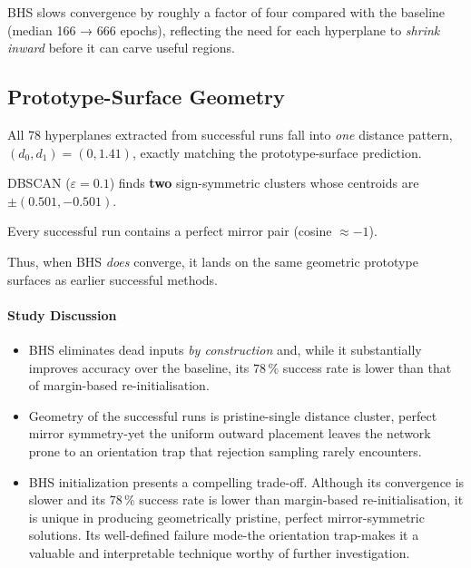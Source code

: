 BHS slows convergence by roughly a factor of four compared with the
baseline (median 166 → 666 epochs), reflecting the need for each
hyperplane to \emph{shrink inward} before it can carve useful regions.

\subsection*{Prototype-Surface Geometry}

\begin{description}[leftmargin=2em]
  \item[Distance clusters]
        All 78 hyperplanes extracted from successful runs fall into
        \emph{one} distance pattern,
        \((d_{0},d_{1})\!=\!(0,1.41)\),
        exactly matching the prototype-surface prediction.
  \item[Weight clusters]
        DBSCAN ($\varepsilon=0.1$) finds \textbf{two}
        sign-symmetric clusters whose centroids are
        $\pm(0.501,-0.501)$.%
  \item[Mirror symmetry]
        Every successful run contains a perfect mirror pair
        (cosine $\approx -1$).%
\end{description}

Thus, when BHS \emph{does} converge, it lands on the
same geometric prototype surfaces as earlier successful methods.

\paragraph{Study Discussion}
\begin{itemize}
  \item BHS eliminates dead inputs \emph{by construction} and, while 
      it substantially improves accuracy over the baseline, its $78\,\%$ 
      success rate is lower than that of margin-based re-initialisation.
  \item Geometry of the successful runs is pristine-single distance
      cluster, perfect mirror symmetry-yet the uniform outward
      placement leaves the network prone to an orientation trap that
      rejection sampling rarely encounters.
  \item BHS initialization presents a compelling trade-off. Although 
      its convergence is slower and its 78\,\% success rate is lower than 
      margin-based re-initialisation, it is unique in producing geometrically 
      pristine, perfect mirror-symmetric solutions. Its well-defined failure 
      mode-the orientation trap-makes it a valuable and interpretable technique 
      worthy of further investigation.
\end{itemize}

\hrulefill
